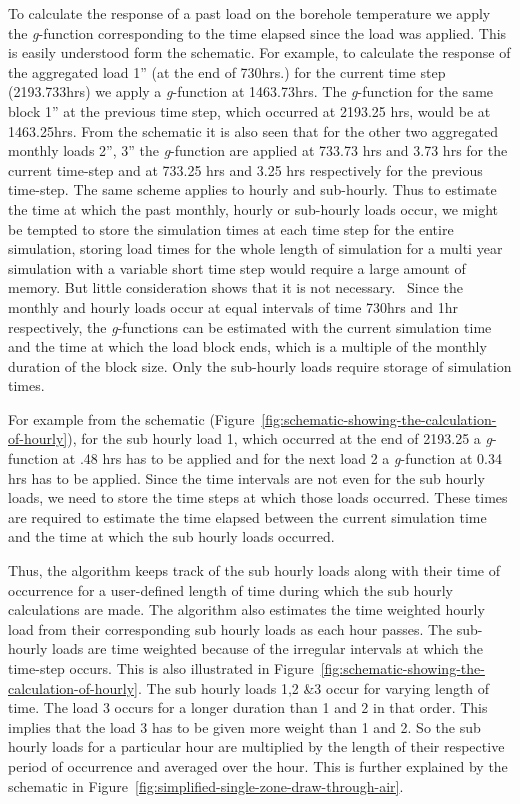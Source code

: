 To calculate the response of a past load on the borehole temperature we apply the \emph{g}-function corresponding to the time elapsed since the load was applied. This is easily understood form the schematic. For example, to calculate the response of the aggregated load 1'' (at the end of 730hrs.) for the current time step (2193.733hrs) we apply a \emph{g}-function at 1463.73hrs. The \emph{g}-function for the same block 1'' at the previous time step, which occurred at 2193.25 hrs, would be at 1463.25hrs. From the schematic it is also seen that for the other two aggregated monthly loads 2'', 3'' the \emph{g}-function are applied at 733.73 hrs and 3.73 hrs for the current time-step and at 733.25 hrs and 3.25 hrs respectively for the previous time-step. The same scheme applies to hourly and sub-hourly. Thus to estimate the time at which the past monthly, hourly or sub-hourly loads occur, we might be tempted to store the simulation times at each time step for the entire simulation, storing load times for the whole length of simulation for a multi year simulation with a variable short time step would require a large amount of memory. But little consideration shows that it is not necessary.~ Since the monthly and hourly loads occur at equal intervals of time 730hrs and 1hr respectively, the \emph{g}-functions can be estimated with the current simulation time and the time at which the load block ends, which is a multiple of the monthly duration of the block size. Only the sub-hourly loads require storage of simulation times.

For example from the schematic (Figure~\ref{fig:schematic-showing-the-calculation-of-hourly}), for the sub hourly load 1, which occurred at the end of 2193.25 a \emph{g}-function at .48 hrs has to be applied and for the next load 2 a \emph{g}-function at 0.34 hrs has to be applied. Since the time intervals are not even for the sub hourly loads, we need to store the time steps at which those loads occurred. These times are required to estimate the time elapsed between the current simulation time and the time at which the sub hourly loads occurred.

Thus, the algorithm keeps track of the sub hourly loads along with their time of occurrence for a user-defined length of time during which the sub hourly calculations are made. The algorithm also estimates the time weighted hourly load from their corresponding sub hourly loads as each hour passes. The sub-hourly loads are time weighted because of the irregular intervals at which the time-step occurs. This is also illustrated in Figure~\ref{fig:schematic-showing-the-calculation-of-hourly}. The sub hourly loads 1,2 \&3 occur for varying length of time. The load 3 occurs for a longer duration than 1 and 2 in that order. This implies that the load 3 has to be given more weight than 1 and 2. So the sub hourly loads for a particular hour are multiplied by the length of their respective period of occurrence and averaged over the hour. This is further explained by the schematic in Figure~\ref{fig:simplified-single-zone-draw-through-air}.

